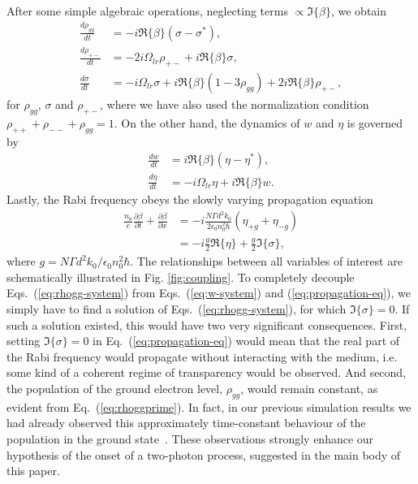 \documentclass[onecolumn,secnumarabic,amssymb, nobibnotes, aip, prd]{revtex4-1}
\def\p{\partial}
\begin{document}
After some simple algebraic operations, neglecting terms $\propto \Im \{\beta\}$, we obtain
\begin{subequations}
	\label{eq:rhogg-system}
	\begin{align}
	\frac{d \rho_{gg}}{dt} &= - i\Re\{\beta\}(\sigma-\sigma^*), \label{eq:rhoggprime} \\
	\frac{d \rho_{+-}}{dt} &= -2i\Omega_{lr}\rho_{+-}+i\Re\{\beta\}\sigma,\\
	\frac{d \sigma}{dt} &= -i\Omega_{lr}\sigma+i\Re\{\beta\}(1-3\rho_{gg})+2i\Re\{\beta\}\rho_{+-},
	\end{align}
\end{subequations}
for $\rho_{gg}$, $\sigma$ and $\rho_{+-}$, where we have also used the normalization condition ${\rho_{++}+\rho_{--}+\rho_{gg} = 1}$. On the other hand, the dynamics of $w$ and $\eta$ is governed by 
\begin{subequations}
\label{eq:w-system}
\begin{align}
\frac{d w}{dt} &= i\Re\{\beta\}(\eta-\eta^*), \\
\frac{d \eta}{dt} &= -i\Omega_{lr}\eta+i\Re\{\beta\} w. \label{eq:eta}
\end{align}
\end{subequations}
Lastly, the Rabi frequency obeys the slowly varying propagation equation \cite{jirauschek2014modeling}
\begin{align}
\label{eq:propagation-eq}
\frac{n_0}{c}\frac{\p \beta}{\p t} + \frac{\p \beta}{\p x} &= - i\frac{N\Gamma d^2 k_0}{2\epsilon_0n_0^2\hbar}(\eta_{+g}+\eta_{-g}) \nonumber \\
		&=  -i\frac{g}{2}\Re\{\eta\}+\frac{g}{2}\Im\{\sigma\},
\end{align}
where $g =N\Gamma d^2 k_0/\epsilon_0n_0^2\hbar $. The relationships between all variables of interest are schematically illustrated in Fig. \ref{fig:coupling}. 
To completely decouple Eqs.~(\ref{eq:rhogg-system}) from Eqs.~(\ref{eq:w-system}) and (\ref{eq:propagation-eq}), we simply have to find a solution of Eqs.~(\ref{eq:rhogg-system}), for which $\Im\{\sigma\} =0$. If such a solution existed, this would have two very significant consequences. First, setting $\Im\{\sigma\} =0$ in Eq.~(\ref{eq:propagation-eq}) would mean that the real part of the Rabi frequency would propagate without interacting with the medium, i.e. some kind of a coherent regime of transparency would be observed. And second, the population of the ground electron level, $\rho_{gg}$, would remain constant, as evident from Eq.~(\ref{eq:rhoggprime}). In fact, in our previous simulation results we had already observed this approximately time-constant behaviour of the population in the ground state~\cite{tzenov2017temporal}. These observations strongly enhance our hypothesis of the onset of a two-photon process, suggested in the main body of this paper.
\end{document}

